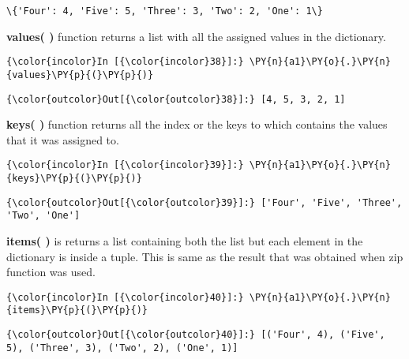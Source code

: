     \begin{Verbatim}[commandchars=\\\{\}]
\{'Four': 4, 'Five': 5, 'Three': 3, 'Two': 2, 'One': 1\}
    \end{Verbatim}

    \textbf{values( )} function returns a list with all the assigned values
in the dictionary.

    \begin{Verbatim}[commandchars=\\\{\}]
{\color{incolor}In [{\color{incolor}38}]:} \PY{n}{a1}\PY{o}{.}\PY{n}{values}\PY{p}{(}\PY{p}{)}
\end{Verbatim}

            \begin{Verbatim}[commandchars=\\\{\}]
{\color{outcolor}Out[{\color{outcolor}38}]:} [4, 5, 3, 2, 1]
\end{Verbatim}
        
    \textbf{keys( )} function returns all the index or the keys to which
contains the values that it was assigned to.

    \begin{Verbatim}[commandchars=\\\{\}]
{\color{incolor}In [{\color{incolor}39}]:} \PY{n}{a1}\PY{o}{.}\PY{n}{keys}\PY{p}{(}\PY{p}{)}
\end{Verbatim}

            \begin{Verbatim}[commandchars=\\\{\}]
{\color{outcolor}Out[{\color{outcolor}39}]:} ['Four', 'Five', 'Three', 'Two', 'One']
\end{Verbatim}
        
    \textbf{items( )} is returns a list containing both the list but each
element in the dictionary is inside a tuple. This is same as the result
that was obtained when zip function was used.

    \begin{Verbatim}[commandchars=\\\{\}]
{\color{incolor}In [{\color{incolor}40}]:} \PY{n}{a1}\PY{o}{.}\PY{n}{items}\PY{p}{(}\PY{p}{)}
\end{Verbatim}

            \begin{Verbatim}[commandchars=\\\{\}]
{\color{outcolor}Out[{\color{outcolor}40}]:} [('Four', 4), ('Five', 5), ('Three', 3), ('Two', 2), ('One', 1)]
\end{Verbatim}
        
